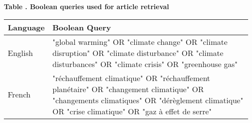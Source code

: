 \documentclass[12pt]{article}
\begin{document}
\begin{center}
\begingroup
{}\label{tab:boolean_queries}
\begin{minipage}{0.95\linewidth}
\centering
\setlength{\tabcolsep}{8pt}
\renewcommand{\arraystretch}{1.25}
\textbf{Table \thetable. Boolean queries used for article retrieval}
\vspace{0.5em}

{\fontsize{10}{12}\selectfont
\begin{tabular}{>{\raggedright\arraybackslash}p{2.8cm} >{\raggedright\arraybackslash}p{12cm}}
\toprule
\textbf{Language} & \textbf{Boolean Query} \\
\midrule
English & "global warming" OR "climate change" OR "climate disruption" OR "climate disturbance" OR "climate disturbances" OR "climate crisis" OR "greenhouse gas" \\
French & "réchauffement climatique" OR "réchauffement planétaire" OR "changement climatique" OR "changements climatiques" OR "dérèglement climatique" OR "crise climatique" OR "gaz à effet de serre" \\
\bottomrule
\end{tabular}
}
\end{minipage}
\endgroup
\end{center}
\end{document}
